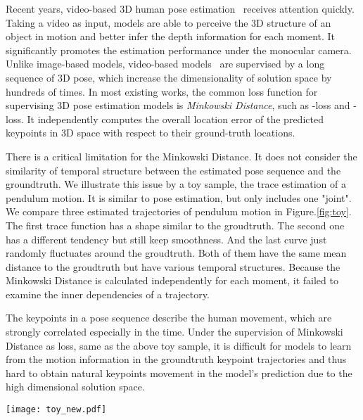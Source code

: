 \documentclass[runningheads]{llncs}
\begin{document}
Recent years, video-based 3D human pose estimation~\cite{cai2019exploiting,lin2019trajectory,lin2017recurrent,dabral2018learning} receives attention quickly.
Taking a video as input, models are able to perceive the 3D structure of an object in motion and better infer the depth information for each moment.
It significantly promotes the estimation performance under the monocular camera.
Unlike image-based models, video-based models~\cite{lin2019trajectory,cai2019exploiting} are supervised by a long sequence of 3D pose,
which increase the dimensionality of solution space by hundreds of times.
In most existing works, the common loss function for supervising 3D pose estimation models is \emph{Minkowski Distance}, such as -loss and -loss.
It independently computes the overall location error of the predicted keypoints in 3D space with respect to their ground-truth locations.

There is a critical limitation for the Minkowski Distance.
It does not consider the similarity of temporal structure between the estimated pose sequence and the groundtruth.
We illustrate this issue by a toy sample, the trace estimation of a pendulum motion.
It is similar to pose estimation, but only includes one "joint".
We compare three estimated trajectories of pendulum motion in Figure.\ref{fig:toy}.
The first trace function has a shape similar to the groudtruth.
The second one has a different tendency but still keep smoothness.
And the last curve just randomly fluctuates around the groudtruth.
Both of them have the same  mean distance to the groudtruth
but have various temporal structures.
Because the Minkowski Distance is calculated independently for each moment,
it failed to examine the inner dependencies of a trajectory.

The keypoints in a pose sequence describe the human movement,
which are strongly correlated especially in the time.
Under the supervision of Minkowski Distance as loss, same as the above toy sample, it is difficult for models to learn from the motion information in the groundtruth keypoint trajectories and thus hard to obtain natural keypoints movement in the model's prediction due to the high dimensional solution space.


\begin{figure*}[t]
    \centering
    \texttt{[image: toy\_new.pdf]}
    \caption{\small
    A toy sample, the location estimation of pendulum motion.
    We show the horizontal location as time varies, a sine curve, denoted in gray, and three estimated traces, denoted in blue, orange and cyan. They have the same  mean distance to the groundtruth but have different temporal structure. Which estimated trace better describes the pendulum motion?
    The loss under different matrices is also shown in the right figure.
    Obviously, motion loss is good at answering the above question.
    }
\label{fig:toy}
\end{figure*}
\end{document}
